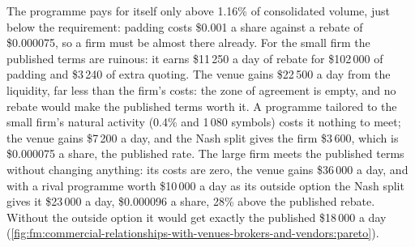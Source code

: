 The programme pays for itself only above 1.16\% of consolidated volume, just below the requirement: padding costs \$0.001 a share against a rebate
of \$0.000075, so a firm must be almost there already. For the small firm the published terms are ruinous: it earns \$11\,250 a day of rebate for
\$102\,000 of padding and \$3\,240 of extra quoting. The venue gains \$22\,500 a day from the liquidity, far less than the firm's costs: the zone
of agreement is empty, and no rebate would make the published terms worth it. A programme tailored to the small firm's natural activity (0.4\% and
1\,080 symbols) costs it nothing to meet; the venue gains \$7\,200 a day, and the Nash split gives the firm \$3\,600, which is \$0.000075 a share, the
published rate. The large firm meets the published terms without changing anything: its costs are zero, the venue gains \$36\,000 a day, and with
a rival programme worth \$10\,000 a day as its outside option the Nash split gives it \$23\,000 a day, \$0.000096 a share, 28\% above the published
rebate. Without the outside option it would get exactly the published \$18\,000 a day
(\cref{fig:fm:commercial-relationships-with-venues-brokers-and-vendors:pareto}).

\begin{omfigure}

\label{fig:fm:commercial-relationships-with-venues-brokers-and-vendors:zopa}
\end{omfigure}

